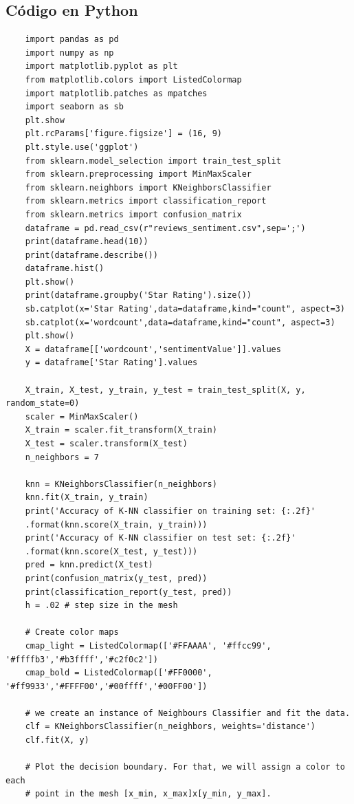\documentclass{article}
\begin{document}
\subsection{C\'odigo en Python}
\begin{verbatim}
    import pandas as pd
    import numpy as np
    import matplotlib.pyplot as plt
    from matplotlib.colors import ListedColormap
    import matplotlib.patches as mpatches
    import seaborn as sb
    plt.show
    plt.rcParams['figure.figsize'] = (16, 9)
    plt.style.use('ggplot')
    from sklearn.model_selection import train_test_split
    from sklearn.preprocessing import MinMaxScaler
    from sklearn.neighbors import KNeighborsClassifier
    from sklearn.metrics import classification_report
    from sklearn.metrics import confusion_matrix
    dataframe = pd.read_csv(r"reviews_sentiment.csv",sep=';')
    print(dataframe.head(10))
    print(dataframe.describe())
    dataframe.hist()
    plt.show()
    print(dataframe.groupby('Star Rating').size())
    sb.catplot(x='Star Rating',data=dataframe,kind="count", aspect=3)
    sb.catplot(x='wordcount',data=dataframe,kind="count", aspect=3)
    plt.show()
    X = dataframe[['wordcount','sentimentValue']].values
    y = dataframe['Star Rating'].values
    
    X_train, X_test, y_train, y_test = train_test_split(X, y, random_state=0)
    scaler = MinMaxScaler()
    X_train = scaler.fit_transform(X_train)
    X_test = scaler.transform(X_test)
    n_neighbors = 7
    
    knn = KNeighborsClassifier(n_neighbors)
    knn.fit(X_train, y_train)
    print('Accuracy of K-NN classifier on training set: {:.2f}'
    .format(knn.score(X_train, y_train)))
    print('Accuracy of K-NN classifier on test set: {:.2f}'
    .format(knn.score(X_test, y_test)))
    pred = knn.predict(X_test)
    print(confusion_matrix(y_test, pred))
    print(classification_report(y_test, pred))
    h = .02 # step size in the mesh
    
    # Create color maps
    cmap_light = ListedColormap(['#FFAAAA', '#ffcc99', '#ffffb3','#b3ffff','#c2f0c2'])
    cmap_bold = ListedColormap(['#FF0000', '#ff9933','#FFFF00','#00ffff','#00FF00'])
    
    # we create an instance of Neighbours Classifier and fit the data.
    clf = KNeighborsClassifier(n_neighbors, weights='distance')
    clf.fit(X, y)
    
    # Plot the decision boundary. For that, we will assign a color to each
    # point in the mesh [x_min, x_max]x[y_min, y_max].
    

\end{verbatim}
\end{document}
